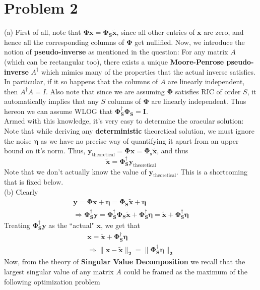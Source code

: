 \documentclass[a4paper,11pt]{article}
\numberwithin{definition}{section}
\numberwithin{mytheorem}{subsection}
\begin{document}
\section{Problem 2}
(a) First of all, note that $\boldsymbol{\Phi x = \Phi_S\widetilde{x}}$, since all other entries of $\boldsymbol{x}$ are zero, and hence all the corresponding columns of $\boldsymbol{\Phi}$ get nullified. Now, we introduce the notion of \textbf{pseudo-inverse} as mentioned in the question: For any matrix $A$ (which can be rectangular too), there exists a unique \textbf{Moore-Penrose pseudo-inverse} $A^{\dagger}$ which mimics many of the properties that the actual inverse satisfies. In particular, if it so happens that the columns of $A$ are linearly independent, then $A^{\dagger}A = I$. Also note that since we are assuming $\boldsymbol{\Phi}$ satisfies RIC of order $S$, it automatically implies that any $S$ columns of $\boldsymbol{\Phi}$ are linearly independent. Thus hereon we can assume WLOG that $\boldsymbol{\Phi^{\dagger}_S\Phi_S = I}$.\\
Armed with this knowledge, it's very easy to determine the oracular solution: Note that while deriving any \textbf{deterministic} theoretical solution, we must ignore the noise $\boldsymbol{\eta}$ as we have no precise way of quantifying it apart from an upper bound on it's norm. Thus, $\boldsymbol{y_{\mathrm{theoretical}} = \Phi x = \Phi_s \widetilde{x}}$, and thus 
$$\boldsymbol{\widetilde{x} = \Phi_S^{\dagger}y_{\mathrm{theoretical}}}$$
Note that we don't actually know the value of $\boldsymbol{y_{\mathrm{theoretical}}}$. This is a shortcoming that is fixed below.
\\
(b) Clearly 
\begin{gather*}
\boldsymbol{y = \Phi x + \eta = \Phi_S\widetilde{x} + \eta} \\
\Rightarrow \boldsymbol{\Phi^{\dagger}_S y = \Phi_S^{\dagger}\Phi_S \widetilde{x} + \Phi_S^{\dagger}\eta = \widetilde{x} + \Phi_S^{\dagger}\eta}
\end{gather*}
Treating $\boldsymbol{\Phi^{\dagger}_S y}$ as the ``actual" $\boldsymbol{x}$, we get that 
\begin{gather*}
    \boldsymbol{x = \widetilde{x} + \Phi^{\dagger}_S\eta}\\
    \Rightarrow\boldsymbol{\lVert x-\widetilde{x}\rVert_2 = \lVert\Phi_S^{\dagger}\eta\rVert_2 }
\end{gather*}
Now, from the theory of \textbf{Singular Value Decomposition} we recall that the largest singular value of any matrix $A$ could be framed as the maximum of the following optimization problem
\end{document}
